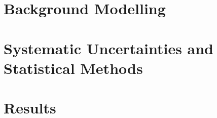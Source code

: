 \section{Background Modelling}
\label{sec:bkgCh}


\section{Systematic Uncertainties and Statistical Methods}
\label{sec:systsCh}


\section{Results}
\label{sec:resCh}

%
